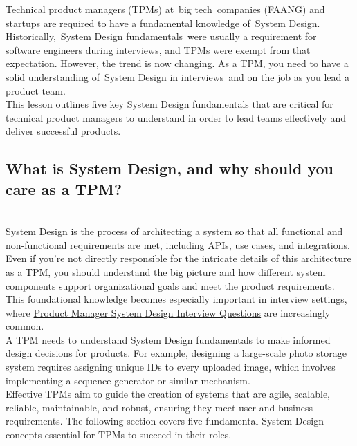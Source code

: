 

Technical product managers (TPMs) at~big tech~companies (FAANG) and startups are required to have a fundamental knowledge of~System Design.
\\
Historically,~System Design fundamentals~were usually a requirement for software engineers during interviews, and TPMs were exempt from that expectation. However, the trend is now changing. As a TPM, you need to have a solid understanding of~System Design in interviews~and on the job as you lead a product team.
\\
This lesson outlines five key System Design fundamentals that are critical for technical product managers to understand in order to lead teams effectively and deliver successful products.

\subsection{What is System Design, and why should you care as a TPM?}\label{7m1aEio1f0Vdbv44j0peL}
\\
System Design is the process of architecting a system so that all functional and non-functional requirements are met, including APIs, use cases, and integrations.
\\
Even if you're not directly responsible for the intricate details of this architecture as a TPM, you should understand the big picture and how different system components support organizational goals and meet the product requirements.
\\
This foundational knowledge becomes especially important in interview settings, where \href{https://www.educative.io/courses/product-manager-system-design-interview-questions}{Product Manager System Design Interview Questions} are increasingly common.
\\
A TPM needs to understand System Design fundamentals to make informed design decisions for products. For example, designing a large-scale photo storage system requires assigning unique IDs to every uploaded image, which involves implementing a sequence generator or similar mechanism.
\\
Effective TPMs aim to guide the creation of systems that are agile, scalable, reliable, maintainable, and robust, ensuring they meet user and business requirements. The following section covers five fundamental System Design concepts essential for TPMs to succeed in their roles.

